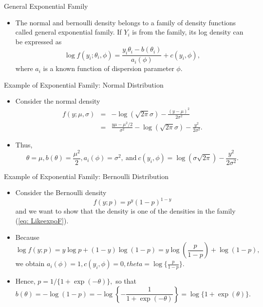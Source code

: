 \documentclass{beamer}
\begin{document}
        
        \begin{frame}{General Exponential Family}
        \begin{itemize}
         \item The normal and bernoulli density belongs to a family of density functions called general exponential family. If $Y_{i}$ is from the family, its log density can be expressed as
         \begin{equation}
                \log f(y_{i};\theta_{i}, \phi) = \frac{y_{i}\theta_{i}-b(\theta_{i})}{a_{i}(\phi)} + c(y_{i}, \phi), \label{eq: LikeexpoF}
        \end{equation}
        where $a_{i}$ is a known function of dispersion parameter $\phi$.
        \end{itemize}
        \end{frame}
        
               \begin{frame}{Example of Exponential Family: Normal Distribution}
        \begin{itemize}
            \item Consider the normal density
            \begin{eqnarray}
                 f(y; \mu, \sigma) & = & -\log\left(\sqrt{2\pi}\sigma\right) - \frac{(y-\mu)^2}{2\sigma^2} \nonumber\\
                 & = & \frac{y\mu-\mu^2/2}{\sigma^2} - \log\left(\sqrt{2\pi}\sigma\right) - \frac{y^2}{2\sigma^2}.
            \end{eqnarray}
            \item Thus,
            $$
            \theta = \mu, b(\theta) = \frac{\mu^2}{2}, a_{i}(\phi) = \sigma^2,\ \mbox{and}\ c(y_{i}, \phi) = \log(\sigma\sqrt{2\pi})-\frac{y^2}{2\sigma^2}.
            $$
        \end{itemize}
    \end{frame}
       

           \begin{frame}{Example of Exponential Family: Bernoulli Distribution}
        \begin{itemize}
            \item Consider the Bernoulli density
            $$f(y; p) = p^{y} (1-p)^{1-y}$$
            and we want to show that the density is one of the densities in the family (\ref{eq: LikeexpoF}).
           \item Because 
           $$\log f(y; p) = y \log p + (1-y)\log(1-p) = y\log (\frac{p}{1-p}) + \log(1-p),$$
           we obtain 
           $a_{i}(\phi) = 1, c(y_{i}, \phi) = 0, theta = \log\{\frac{p}{1-p}\}.$
           \item Hence,  $p = 1/\{1+\exp(-\theta)\},$ so that
             $$b(\theta) = -\log(1-p) = -\log\left\{-\frac{1}{1+\exp(-\theta)}\right\} = \log\{1+\exp(\theta)\}.$$
         
        \end{itemize}
    \end{frame}
    
\end{document}
